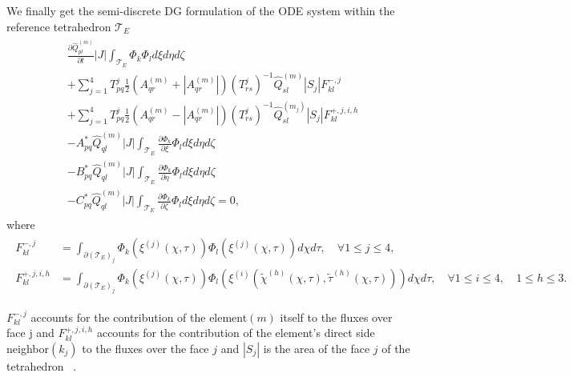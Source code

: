 We finally get the semi-discrete \ac{DG} formulation of the ODE system within the reference tetrahedron $\mathcal{T}_E$
\begin{align}
    \begin{split}
        & \frac{\partial \hat{Q}_{pl}^{\left(m\right)}}{\partial t} \left|J\right| \int_{\mathcal{T}_E} \Phi_k \Phi_l d\xi d\eta d\zeta \\
        & + \sum_{j=1}^4 T_{pq}^j \frac{1}{2} \left(A_{qr}^{\left(m\right)} + \left| A_{qr}^{\left(m\right)}\right| \right) \left(T_{rs}^j\right)^{-1} \hat{Q}_{sl}^{\left(m\right)} \left|S_j\right| F_{kl}^{-,j} \\
        & + \sum_{j=1}^4 T_{pq}^j \frac{1}{2} \left(A_{qr}^{\left(m\right)} - \left| A_{qr}^{\left(m\right)}\right| \right) \left(T_{rs}^j\right)^{-1} \hat{Q}_{sl}^{\left(m_j\right)}\left|S_j\right| F_{kl}^{+,j,i,h} \\ 
        & - A_{pq}^* \hat{Q}_{ql}^{\left(m\right)} \left|J\right| \int_{\mathcal{T}_E} \frac{\partial \Phi_k}{\partial \xi} \Phi_l d\xi d\eta d\zeta \\
        & - B_{pq}^* \hat{Q}_{ql}^{\left(m\right)} \left|J\right| \int_{\mathcal{T}_E} \frac{\partial \Phi_k}{\partial \eta} \Phi_l d\xi d\eta d\zeta \\
        & - C_{pq}^* \hat{Q}_{ql}^{\left(m\right)} \left|J\right| \int_{\mathcal{T}_E} \frac{\partial \Phi_k}{\partial \zeta} \Phi_l d\xi d\eta d\zeta = 0,
    \end{split}
    \label{eq:finalform}
\end{align}
where 
\begin{align}
    \begin{split}
        F_{kl}^{-,j} &= \int_{\partial \left(\mathcal{T}_E\right)_j} \Phi_k \left(\xi^{\left(j\right)}\left(\chi, \tau\right)\right)\Phi_l \left(\xi^{\left(j\right)}\left(\chi, \tau\right)\right) d\chi d\tau, \quad \forall 1 \leq j\leq4 , \\
        F_{kl}^{+,j,i,h} &= \int_{\partial \left(\mathcal{T}_E\right)_j} \Phi_k \left(\xi^{\left(j\right)}\left(\chi, \tau\right)\right)\Phi_l \left(\xi^{\left(i\right)} \left( \tilde{\chi}^{(h)}\left(\chi, \tau\right), \tilde{\tau}^{\left(h\right)}\left(\chi, \tau\right) \right)\right) d\chi d\tau, \quad \forall 1 \leq i \leq 4, \quad 1 \leq h \leq 3.
    \end{split}
\end{align}

$F_{kl}^{-,j}$ accounts for the contribution of the element$\left(m\right)$ itself to the fluxes over face j and
$F_{kl}^{+,j,i,h}$ accounts for the contribution
of the element's direct side neighbor$\left(k_j\right)$ to the fluxes over the face $j$ and $\left|S_j\right|$ is the area of the face $j$ of the tetrahedron ~\parencite{dumbser1}. \\

